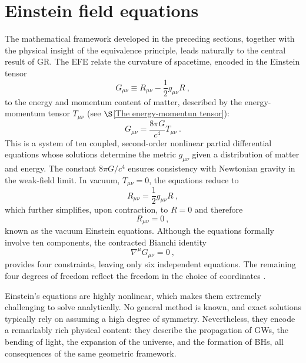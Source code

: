 \section{Einstein field equations}


The mathematical framework developed in the preceding sections, together with the physical insight of the equivalence principle, leads naturally to the central result of GR. The EFE relate the curvature of spacetime, encoded in the Einstein tensor
\begin{equation}
G_{\mu\nu} \equiv R_{\mu\nu} - \frac{1}{2} g_{\mu\nu} R \ ,
\end{equation}
to the energy and momentum content of matter, described by the energy-momentum tensor $T_{\mu\nu}$ (see $\S$\ref{The energy-momentun tensor}):
\begin{equation}
G_{\mu\nu} = \frac{8\pi G}{c^4} T_{\mu\nu} \ .
\label{einsteinequations}
\end{equation}
This is a system of ten coupled, second-order nonlinear partial differential equations whose solutions determine the metric $g_{\mu\nu}$ given a distribution of matter and energy. The constant $8\pi G/c^4$ ensures consistency with Newtonian gravity in the weak-field limit. 
In vacuum, $T_{\mu\nu} = 0$, the equations reduce to
\begin{equation}
R_{\mu\nu} = \frac{1}{2} g_{\mu\nu} R \ ,
\end{equation}
which further simplifies, upon contraction, to $R = 0$ and therefore
\begin{equation}
R_{\mu\nu} = 0 \ ,
\end{equation}
known as the vacuum Einstein equations. Although the equations formally involve ten components, the contracted Bianchi identity 
\begin{equation}
\nabla^\mu G_{\mu\nu} = 0 \ ,
\end{equation}
provides four constraints, leaving only six independent equations. The remaining four degrees of freedom reflect the freedom in the choice of coordinates \cite{LlibreBertJanssen}.

Einstein's equations are highly nonlinear, which makes them extremely challenging to solve analytically. No general method is known, and exact solutions typically rely on assuming a high degree of symmetry. Nevertheless, they encode a remarkably rich physical content: they describe the propagation of GWs, the bending of light, the expansion 
of the universe, and the formation of BHs, all consequences of the same geometric framework.


